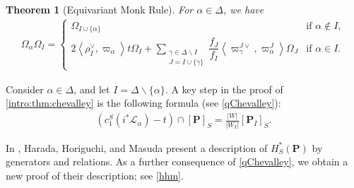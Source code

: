 \documentclass[10pt]{article}
\newtheorem{thm}{Theorem}
\numberwithin{thm}{section}
\theoremstyle{definition}
\theoremstyle{remark}
\newcommand{\Pet}{\ensuremath{\mathbf{P}}}
\newcommand{\set}[2]{\left\{#1\,\middle\vert\,#2\right\}}
\begin{document}

\begin{thm}[Equivariant Monk Rule]
\label{intro:thm:monk}
For $\alpha\in\Delta$, we have
\begin{align*}
\Omega_\alpha \Omega_I=
\begin{cases}
\Omega_{I\cup\{\alpha\}}
&\text{if }\alpha\not\in I,\\
2\left\langle\rho^\vee_I,\varpi_\alpha\right\rangle t \Omega_I+
\sum\limits_{\substack{\gamma\in\Delta\backslash I\\J=I\cup\{\gamma\}}}
\dfrac{f_J}{f_I}\left\langle\varpi_\gamma^{J\vee},\varpi^J_\alpha\right\rangle \Omega_J
&\text{if }\alpha\in I.
\end{cases}
\end{align*}
\end{thm}


Consider $\alpha\in\Delta$, and let $I=\Delta\backslash\{\alpha\}$.
A key step in the proof of
 \cref{intro:thm:chevalley} is the following formula (see \cref{qChevalley}):
\begin{align}
\label{intro:qChevalley}
(c_1^S(i^*\mathcal L_\alpha)-t)\cap[\Pet]_S=\frac{|W|}{|W_I|}[\Pet_I]_S.
\end{align}

In  \cite{harada.horiguchi.masuda:Peterson}, Harada, Horiguchi, and Masuda present a description of $H^*_S(\Pet)$ by generators and relations. As a further consequence of \cref{qChevalley}, we
obtain a new proof of their description; %
see \cref{hhm}.
\end{document}
